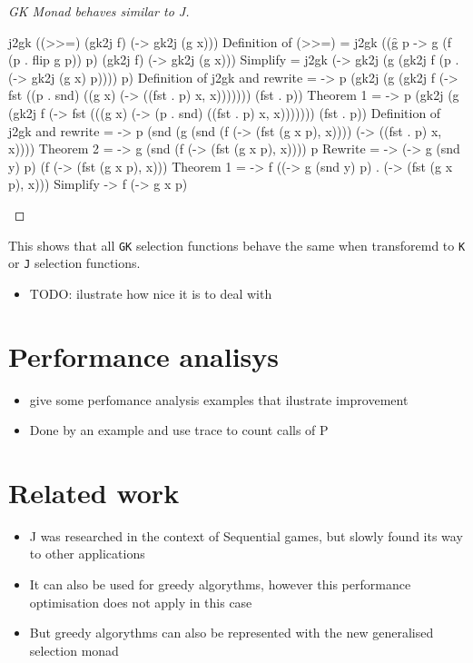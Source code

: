 \documentclass[runningheads]{llncs}
\providecommand{\tightlist}{%
  \setlength{\itemsep}{0pt}\setlength{\parskip}{0pt}}
\begin{document}
\begin{proof}[GK Monad behaves similar to J]
\begin{haskell}
j2gk ((>>=) (gk2j f) (\x -> gk2j (g x)))                                                         
{{ Definition of (>>=) }}
= j2gk ((\f g p -> g (f (p . flip g p)) p) (gk2j f) (\x -> gk2j (g x)))
{{ Simplify }}
= j2gk (\p -> gk2j (g (gk2j f (p . (\x -> gk2j (g x) p)))) p)
{{ Definition of j2gk and rewrite }}
= \p -> p (gk2j (g (gk2j f (\x -> fst ((p . snd) ((g x) (\x -> ((fst . p) x, x))))))) (fst . p))
{{ Theorem 1 }}
= \p -> p (gk2j (g (gk2j f (\x -> fst (((g x) (\x -> (p . snd) ((fst . p) x, x))))))) (fst . p))
{{Definition of j2gk and rewrite }}                  
= \p -> p (snd (g (snd (f (\x -> (fst (g x p), x)))) (\x -> ((fst . p) x, x))))
{{ Theorem 2 }}
= \p -> g (snd (f (\x -> (fst (g x p), x)))) p
{{ Rewrite }}
= \p -> (\y -> g (snd y) p) (f (\x -> (fst (g x p), x)))
{{ Theorem 1 }}
= \p -> f ((\y -> g (snd y) p) . (\x -> (fst (g x p), x)))  
{{ Simplify }}
\p -> f (\x -> g x p)
\end{haskell}
\end{proof}

This shows that all \texttt{GK} selection functions behave the same when
transforemd to \texttt{K} or \texttt{J} selection functions.

\begin{itemize}
\tightlist
\item
  TODO: ilustrate how nice it is to deal with
\end{itemize}

\section{Performance analisys}\label{performance-analisys}

\begin{itemize}
\tightlist
\item
  give some perfomance analysis examples that ilustrate improvement
\item
  Done by an example and use trace to count calls of P
\end{itemize}

\section{Related work}\label{related-work}

\begin{itemize}
\item
  J was researched in the context of Sequential games, but slowly found
  its way to other applications
\item
  It can also be used for greedy algorythms, however this performance
  optimisation does not apply in this case
\item
  But greedy algorythms can also be represented with the new generalised
  selection monad
\end{itemize}
\end{document}
